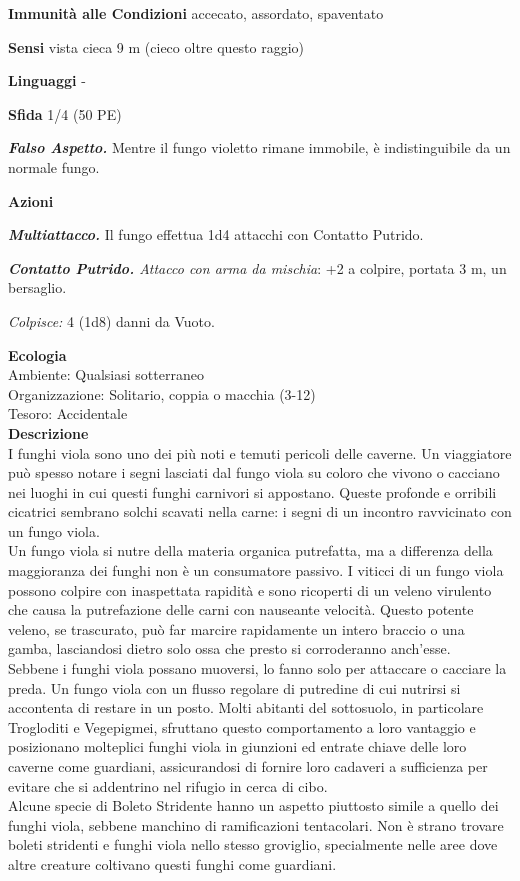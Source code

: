 \begin{multicols}{2}
\textbf{Immunità alle Condizioni} accecato, assordato, spaventato 

\textbf{Sensi} vista cieca 9 m (cieco oltre questo raggio)

\textbf{Linguaggi} -

\textbf{Sfida} 1/4 (50 PE)

\emph{\textbf{Falso Aspetto.}} Mentre il fungo violetto rimane immobile, è indistinguibile da un normale fungo.

\textbf{Azioni}

\emph{\textbf{Multiattacco.}} Il fungo effettua 1d4 attacchi con Contatto Putrido.

\emph{\textbf{Contatto Putrido.} Attacco con arma da mischia}: +2 a colpire,  portata 3 m, un bersaglio.

\emph{Colpisce:} 4 (1d8) danni da Vuoto.

\textbf{Ecologia}\\
Ambiente: Qualsiasi sotterraneo\\
Organizzazione: Solitario, coppia o macchia (3-12)\\
Tesoro: Accidentale\\
\textbf{Descrizione}\\
I funghi viola sono uno dei più noti e temuti pericoli delle caverne. Un viaggiatore può spesso notare i segni lasciati dal fungo viola su coloro che vivono o cacciano nei luoghi in cui questi funghi carnivori si appostano. Queste profonde e orribili cicatrici sembrano solchi scavati nella carne: i segni di un incontro ravvicinato con un fungo viola.\\
Un fungo viola si nutre della materia organica putrefatta, ma a differenza della maggioranza dei funghi non è un consumatore passivo. I viticci di un fungo viola possono colpire con inaspettata rapidità e sono ricoperti di un veleno virulento che causa la putrefazione delle carni con nauseante velocità. Questo potente veleno, se trascurato, può far marcire rapidamente un intero braccio o una gamba, lasciandosi dietro solo ossa che presto si corroderanno anch'esse.\\
Sebbene i funghi viola possano muoversi, lo fanno solo per attaccare o cacciare la preda. Un fungo viola con un flusso regolare di putredine di cui nutrirsi si accontenta di restare in un posto. Molti abitanti del sottosuolo, in particolare Trogloditi e Vegepigmei, sfruttano questo comportamento a loro vantaggio e posizionano molteplici funghi viola in giunzioni ed entrate chiave delle loro caverne come guardiani, assicurandosi di fornire loro cadaveri a sufficienza per evitare che si addentrino nel rifugio in cerca di cibo.\\
Alcune specie di Boleto Stridente hanno un aspetto piuttosto simile a quello dei funghi viola, sebbene manchino di ramificazioni tentacolari. Non è strano trovare boleti stridenti e funghi viola nello stesso groviglio, specialmente nelle aree dove altre creature coltivano questi funghi come guardiani.\\


\end{multicols}

